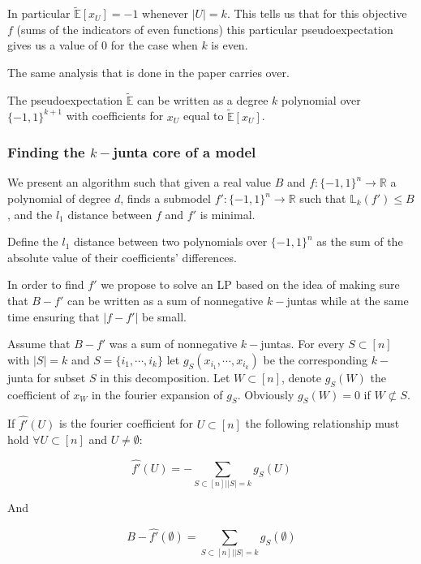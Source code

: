 In particular $\tilde{\mathbb{E}}[x_U] = -1$ whenever $|U| = k$. This tells us that for this objective $f$ (sums of the indicators of even functions) this particular pseudoexpectation gives us a value of $0$ for the case when $k$ is even. 

The same analysis that is done in the paper carries over. 

The pseudoexpectation $\tilde{\mathbb{E}}$ can be written as a degree $k$ polynomial over $\{-1,1\}^{k+1}$ with coefficients for $x_U$ equal to $\tilde{\mathbb{E}}[x_U]$.



\subsubsection{Finding the $k-$junta core of a model }

We present an algorithm such that given a real value $B$ and $f :\{ -1,1\}^n \rightarrow \mathbb{R}$ a polynomial of degree $d$, finds a submodel $f':\{-1, 1\}^n \rightarrow \mathbb{R}$ such that  $\mathbb{L}_k(f') \leq B$, and the $l_1$ distance between $f$ and $f'$ is minimal. 

Define the $l_1$ distance between two polynomials over $\{-1,1\}^n$ as the sum of the absolute value of their coefficients' differences.

In order to find $f'$ we propose to solve an LP based on the idea of making sure that $B - f'$ can be written as a sum of nonnegative $k-$juntas while at the same time ensuring that $|f - f'|$ be small. 


Assume that $B - f'$ was a sum of nonnegative $k-$juntas. For every $S \subset [n]$ with $|S| =k$ and $S = \{i_1, \cdots, i_k\}$ let $g_S(x_{i_1}, \cdots, x_{i_k})$ be the corresponding $k-$junta for subset $S$ in this decomposition. Let $W \subset [n]$, denote $g_S(W)$ the coefficient of $x_W$ in the fourier expansion of $g_S$. Obviously $g_S(W) = 0$ if $W \not\subset S$.

If $\hat{f'}(U)$ is the fourier coefficient for $U \subset [n]$ the following relationship must hold $\forall U \subset [n]$ and $U \neq\emptyset $:

\begin{equation}
\hat{f'}(U) = -\sum_{S \subset [n] | |S| = k} g_S(U)   
\end{equation}

And

\begin{equation}
B - \hat{f'}(\emptyset) = \sum_{S \subset [n] | |S| = k} g_S(\emptyset) 
\end{equation}

